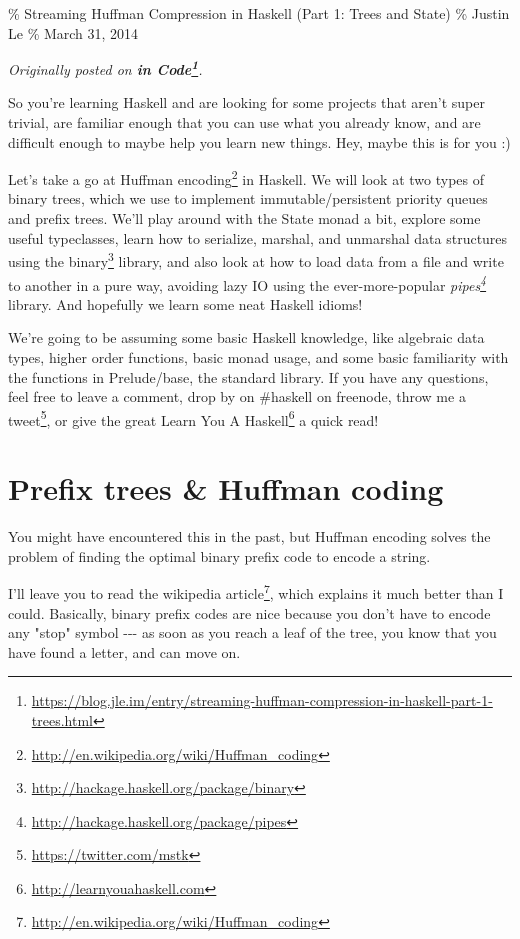 \documentclass[]{article}
\renewcommand{\href}[2]{#2\footnote{\url{#1}}}
\begin{document}
\% Streaming Huffman Compression in Haskell (Part 1: Trees and State) \% Justin
Le \% March 31, 2014

\emph{Originally posted on
\textbf{\href{https://blog.jle.im/entry/streaming-huffman-compression-in-haskell-part-1-trees.html}{in
Code}}.}

So you're learning Haskell and are looking for some projects that aren't super
trivial, are familiar enough that you can use what you already know, and are
difficult enough to maybe help you learn new things. Hey, maybe this is for you
:)

Let's take a go at \href{http://en.wikipedia.org/wiki/Huffman_coding}{Huffman
encoding} in Haskell. We will look at two types of binary trees, which we use to
implement immutable/persistent priority queues and prefix trees. We'll play
around with the State monad a bit, explore some useful typeclasses, learn how to
serialize, marshal, and unmarshal data structures using the
\href{http://hackage.haskell.org/package/binary}{binary} library, and also look
at how to load data from a file and write to another in a pure way, avoiding
lazy IO using the ever-more-popular
\emph{\href{http://hackage.haskell.org/package/pipes}{pipes}} library. And
hopefully we learn some neat Haskell idioms!

We're going to be assuming some basic Haskell knowledge, like algebraic data
types, higher order functions, basic monad usage, and some basic familiarity
with the functions in Prelude/base, the standard library. If you have any
questions, feel free to leave a comment, drop by on \#haskell on freenode, throw
me a \href{https://twitter.com/mstk}{tweet}, or give the great
\href{http://learnyouahaskell.com}{Learn You A Haskell} a quick read!

\section{Prefix trees \& Huffman coding}

You might have encountered this in the past, but Huffman encoding solves the
problem of finding the optimal binary prefix code to encode a string.

I'll leave you to read \href{http://en.wikipedia.org/wiki/Huffman_coding}{the
wikipedia article}, which explains it much better than I could. Basically,
binary prefix codes are nice because you don't have to encode any "stop" symbol
-\/-\/- as soon as you reach a leaf of the tree, you know that you have found a
letter, and can move on.
\end{document}

